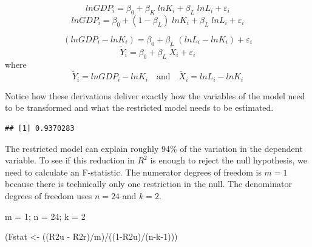 \documentclass[
]{book}
\newenvironment{Shaded}{\begin{snugshade}}{\end{snugshade}}
\newcommand{\DecValTok}[1]{\textcolor[rgb]{0.00,0.00,0.81}{#1}}
\newcommand{\FunctionTok}[1]{\textcolor[rgb]{0.00,0.00,0.00}{#1}}
\newcommand{\NormalTok}[1]{#1}
\newcommand{\OtherTok}[1]{\textcolor[rgb]{0.56,0.35,0.01}{#1}}
\newcommand{\SpecialCharTok}[1]{\textcolor[rgb]{0.00,0.00,0.00}{#1}}
\begin{document}
\[lnGDP_i = \beta_0 + \beta_K \; lnK_i + \beta_L \; lnL_i + \varepsilon_i\]
\[lnGDP_i = \beta_0 + (1 - \beta_L) \; lnK_i + \beta_L \; lnL_i + \varepsilon_i\]

\[(lnGDP_i - lnK_i) = \beta_0 + \beta_L \; (lnL_i - lnK_i) + \varepsilon_i\]
\[\tilde{Y}_i = \beta_0 + \beta_L \; \tilde{X}_i + \varepsilon_i\]
where
\[\tilde{Y}_i=lnGDP_i - lnK_i \quad \text{and} \quad \tilde{X}_i=lnL_i - lnK_i\]

Notice how these derivations deliver exactly how the variables of the model need to be transformed and what the restricted model needs to be estimated.

\begin{Shaded}
\end{Shaded}

\begin{verbatim}
## [1] 0.9370283
\end{verbatim}

The restricted model can explain roughly 94\% of the variation in the dependent variable. To see if this reduction in \(R^2\) is enough to reject the null hypothesis, we need to calculate an F-statistic. The numerator degrees of freedom is \(m=1\) because there is technically only one restriction in the null. The denominator degrees of freedom uses \(n=24\) and \(k=2\).

\begin{Shaded}
\begin{Highlighting}[]
\NormalTok{m }\OtherTok{=} \DecValTok{1}\NormalTok{; n }\OtherTok{=} \DecValTok{24}\NormalTok{; k }\OtherTok{=} \DecValTok{2}

\NormalTok{(Fstat }\OtherTok{\textless{}{-}}\NormalTok{ ((R2u }\SpecialCharTok{{-}}\NormalTok{ R2r)}\SpecialCharTok{/}\NormalTok{m)}\SpecialCharTok{/}\NormalTok{((}\DecValTok{1}\SpecialCharTok{{-}}\NormalTok{R2u)}\SpecialCharTok{/}\NormalTok{(n}\SpecialCharTok{{-}}\NormalTok{k}\DecValTok{{-}1}\NormalTok{)))}
\end{Highlighting}
\end{Shaded}
\end{document}
